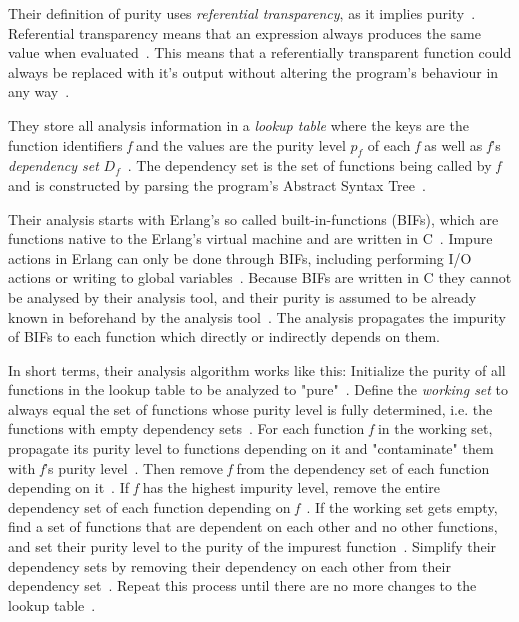 \documentclass[a4paper,12pt]{article}
\begin{document}
Their definition of purity uses \textit{referential transparency}, as it implies purity~\cite{pitidis2010purity}. Referential transparency means that an expression always produces the same value when evaluated~\cite{pitidis2010purity}. This means that a referentially transparent function could always be replaced with it's output without altering the program's behaviour in any way~\cite{pitidis2010purity}.

They store all analysis information in a \textit{lookup table} where the keys are the function identifiers \textit{f} and the values are the purity level \textit{$p_f$} of each \textit{f} as well as \textit{f}'s \textit{dependency set} $D_f$~\cite{pitidis2010purity}. The dependency set is the set of functions being called by \textit{f} and is constructed by parsing the program's Abstract Syntax Tree~\cite{pitidis2010purity}.

Their analysis starts with Erlang's so called built-in-functions (BIFs), which are functions native to the Erlang's virtual machine and are written in C~\cite{pitidis2010purity}. Impure actions in Erlang can only be done through BIFs, including performing I/O actions or writing to global variables~\cite{kostis-email}. Because BIFs are written in C they cannot be analysed by their analysis tool, and their purity is assumed to be already known in beforehand by the analysis tool~\cite{pitidis2010purity}. The analysis propagates the impurity of BIFs to each function which directly or indirectly depends on them.

In short terms, their analysis algorithm works like this: Initialize the purity of all functions in the lookup table to be analyzed to "pure"~\cite{pitidis2010purity}. Define the \textit{working set} to always equal the set of functions whose purity level is fully determined, i.e. the functions with empty dependency sets~\cite{pitidis2010purity}. For each function \textit{f} in the working set, propagate its purity level to functions depending on it and "contaminate" them with \textit{f}'s purity level~\cite{pitidis2010purity}. Then remove \textit{f} from the  dependency set of each function depending on it~\cite{pitidis2010purity}. If \textit{f} has the highest impurity level, remove the entire dependency set of each function depending on \textit{f}~\cite{pitidis2010purity}. If the working set gets empty, find a set of functions that are dependent on each other and no other functions, and set their purity level to the purity of the impurest function~\cite{pitidis2010purity}. Simplify their dependency sets by removing their dependency on each other from their dependency set~\cite{pitidis2010purity}. Repeat this process until there are no more changes to the lookup table~\cite{pitidis2010purity}.
\end{document}
